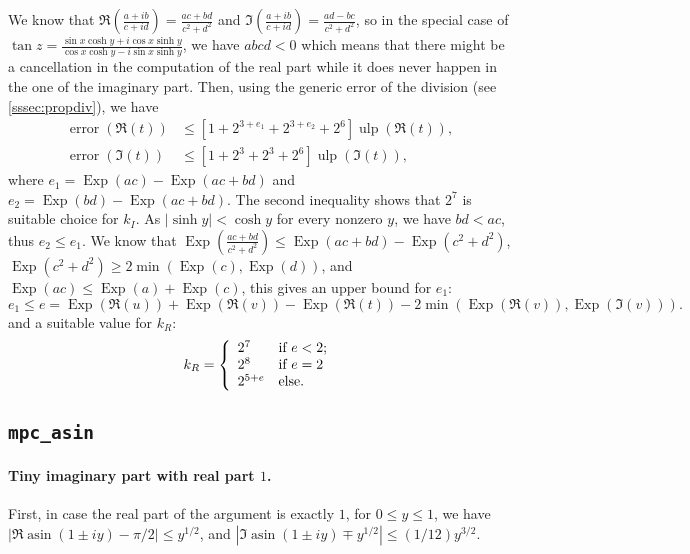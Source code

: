 \documentclass [11pt]{article}
\newcommand {\Ulp}{{\operatorname {ulp}}}
\DeclareMathOperator{\Exp}{\operatorname {Exp}}
\newcommand {\asin}{\operatorname {asin}}
\newcommand{\error}{\operatorname {error}}
\renewcommand {\leq}{\leqslant}
\renewcommand {\geq}{\geqslant}
\begin{document}
We know that $\Re(\frac{a+i b}{c+i d})=\frac{a c +b d}{c^2 + d^2}$ and
$\Im(\frac{a+i b}{c+i d})=\frac{a d -b c}{c^2 + d^2}$, so in the special case
of $\tan z=\frac{\sin x\cosh y+i\cos x\sinh y}{\cos x\cosh y-i\sin x\sinh y}$,
we have $abcd < 0$ which means that there might be a cancellation in the
computation of the real part while it does never happen in the one of the
imaginary part.  Then, using the generic error of the division (see
\ref{sssec:propdiv}), we have
\begin{align*}
\error(\Re(t)) &\leq [1+2^{3+e_1}+2^{3+e_2}+2^6] \Ulp(\Re(t)),
\\
\error(\Im(t)) &\leq [1+2^3+2^3+2^6] \Ulp(\Im(t)),
\end{align*}
where $e_1=\Exp(a c) -\Exp(a c+b d)$ and $e_2=\Exp(b d) -\Exp(a c+b d)$.  The
second inequality shows that $2^7$ is suitable choice for $k_I$. As $|\sinh
y|<\cosh y$ for every nonzero $y$, we have $bd<ac$, thus $e_2\leq e_1$. We
know that $\Exp(\frac{a c+b d}{c^2+d^2})\leq \Exp(a c+b d) -\Exp(c^2+d^2)$,
$\Exp(c^2+d^2)\geq2 \min(\Exp(c), \Exp(d))$, and $\Exp(ac) \leq \Exp(a) +
\Exp(c)$, this gives an upper bound for $e_1$:
\[
e_1 \leq e = \Exp(\Re(u)) +\Exp(\Re(v)) -\Exp(\Re(t))
-2 \min(\Exp(\Re(v)), \Exp(\Im(v))).
\]
and a suitable value for $k_R$:
\begin{equation*}
k_R=\left\{
\begin{array}{l l}
  2^7 & \mbox{if $e < 2$;}
  \\
  2^8 & \mbox{if $e = 2$}
  \\
  2^{5 + e} & \mbox{else.}
\end{array}
\right.
\end{equation*}

\subsection {\texttt {mpc\_asin}}

\paragraph{Tiny imaginary part with real part $1$.}
First, in case the real part of the argument is exactly $1$,
for $0 \leq y \leq 1$, we have $|\Re \asin (1 \pm iy) - \pi/2|
\leq y^{1/2}$, and $|\Im \asin (1 \pm iy) \mp y^{1/2}| \leq (1/12) y^{3/2}$.
\end{document}
